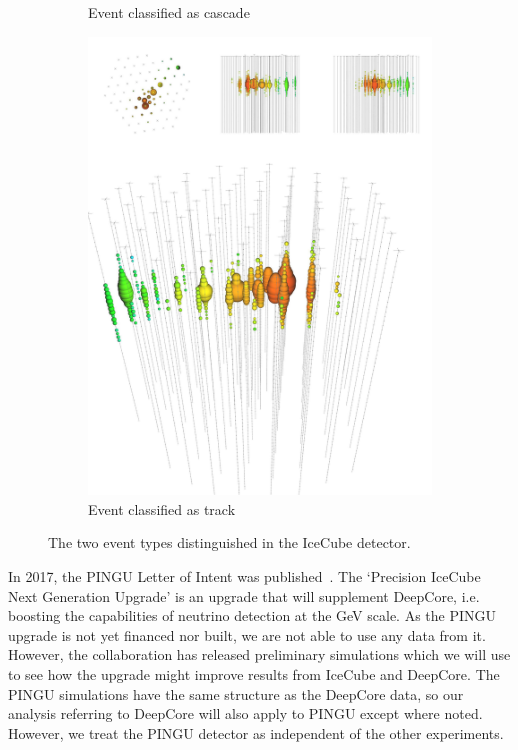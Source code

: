 \begin{figure}
\begin{center}
\begin{subfigure}{0.4\textwidth}
            \caption{Event classified as cascade}  
            \label{fig:events_cascade}
          \end{subfigure}
        \begin{subfigure}{0.4\textwidth}
            \centering
            \includegraphics[clip, trim=0cm 0cm 0cm 30cm, width=1\textwidth]{figures/track_event.pdf}
            \caption{Event classified as track} 
            \label{fig:events_track}
        \end{subfigure}
        \caption{The two event types distinguished in the IceCube detector.}
    \end{center}
\end{figure}


In 2017, the PINGU Letter of Intent was published~\cite{PINGUletter}. The `Precision IceCube Next Generation Upgrade' is an upgrade that will 
supplement DeepCore, i.e. boosting the capabilities of neutrino detection at the \si{\GeV} scale. As the PINGU upgrade is not yet financed nor built, we are
not able to use any data from it. However, the collaboration has released preliminary simulations which we will use to see how the upgrade might improve
results from IceCube and DeepCore. The PINGU simulations have the same structure as the DeepCore data, so our analysis referring to DeepCore will
also apply to PINGU except where noted. However, we treat the PINGU detector as independent of the other experiments.


